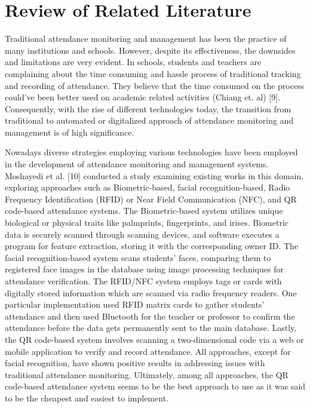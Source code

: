 \documentclass[journal]{./IEEE/IEEEtran}
\begin{document}
\section{Review of Related Literature}
Traditional attendance monitoring and management has been the practice of many institutions and schools. However, despite its effectiveness, the downsides and limitations are very evident. In schools, students and teachers are complaining about the time consuming and hassle process of traditional tracking and recording of attendance. They believe that the time consumed on the process could’ve been better used on academic related activities (Chiang et. al) [9]. Consequently, with the rise of different technologies today, the transition from traditional to automated or digitalized approach of attendance monitoring and management is of high significance.  

Nowadays diverse strategies employing various technologies have been employed in the development of attendance monitoring and management systems. Moshayedi et al. [10] conducted a study examining existing works in this domain, exploring approaches such as Biometric-based, facial recognition-based, Radio Frequency Identification (RFID) or Near Field Communication (NFC), and QR code-based attendance systems. The Biometric-based system utilizes unique biological or physical traits like palmprints, fingerprints, and irises. Biometric data is securely scanned through scanning devices, and software executes a program for feature extraction, storing it with the corresponding owner ID. The facial recognition-based system scans students' faces, comparing them to registered face images in the database using image processing techniques for attendance verification. The RFID/NFC system employs tags or cards with digitally stored information which are scanned via radio frequency readers. One particular implementation used RFID matrix cards to gather students’ attendance and then used Bluetooth for the teacher or professor to confirm the attendance before the data gets permanently sent to the main database. Lastly, the QR code-based system involves scanning a two-dimensional code via a web or mobile application to verify and record attendance. All approaches, except for facial recognition, have shown positive results in addressing issues with traditional attendance monitoring. Ultimately, among all approaches, the QR code-based attendance system seems to be the best approach to use as it was said to be the cheapest and easiest to implement.
\end{document}
